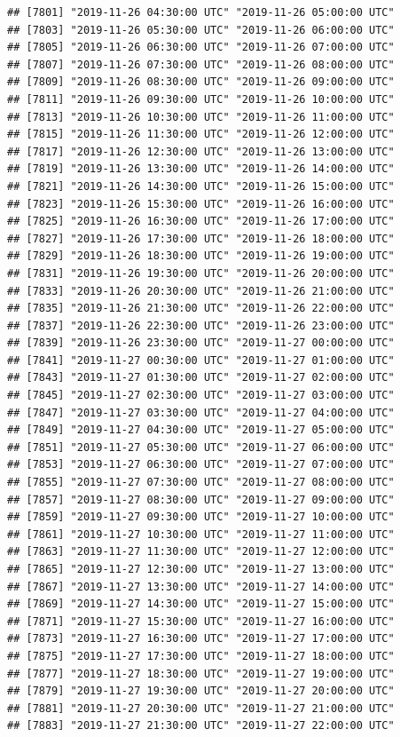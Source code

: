 \documentclass{article}\usepackage[]{graphicx}\usepackage[]{color}
\makeatletter
\newenvironment{kframe}{%
 \def\at@end@of@kframe{}%
 \ifinner\ifhmode%
  \def\at@end@of@kframe{\end{minipage}}%
  \begin{minipage}{\columnwidth}%
 \fi\fi%
 \def\FrameCommand##1{\hskip\@totalleftmargin \hskip-\fboxsep
 \colorbox{shadecolor}{##1}\hskip-\fboxsep
     \hskip-\linewidth \hskip-\@totalleftmargin \hskip\columnwidth}%
 \MakeFramed {\advance\hsize-\width
   \@totalleftmargin\z@ \linewidth\hsize
   \@setminipage}}%
 {\par\unskip\endMakeFramed%
 \at@end@of@kframe}
\newenvironment{knitrout}{}{} %
\makeatother
\begin{document}
\begin{knitrout}
\begin{kframe}
\begin{verbatim}
## [7801] "2019-11-26 04:30:00 UTC" "2019-11-26 05:00:00 UTC"
## [7803] "2019-11-26 05:30:00 UTC" "2019-11-26 06:00:00 UTC"
## [7805] "2019-11-26 06:30:00 UTC" "2019-11-26 07:00:00 UTC"
## [7807] "2019-11-26 07:30:00 UTC" "2019-11-26 08:00:00 UTC"
## [7809] "2019-11-26 08:30:00 UTC" "2019-11-26 09:00:00 UTC"
## [7811] "2019-11-26 09:30:00 UTC" "2019-11-26 10:00:00 UTC"
## [7813] "2019-11-26 10:30:00 UTC" "2019-11-26 11:00:00 UTC"
## [7815] "2019-11-26 11:30:00 UTC" "2019-11-26 12:00:00 UTC"
## [7817] "2019-11-26 12:30:00 UTC" "2019-11-26 13:00:00 UTC"
## [7819] "2019-11-26 13:30:00 UTC" "2019-11-26 14:00:00 UTC"
## [7821] "2019-11-26 14:30:00 UTC" "2019-11-26 15:00:00 UTC"
## [7823] "2019-11-26 15:30:00 UTC" "2019-11-26 16:00:00 UTC"
## [7825] "2019-11-26 16:30:00 UTC" "2019-11-26 17:00:00 UTC"
## [7827] "2019-11-26 17:30:00 UTC" "2019-11-26 18:00:00 UTC"
## [7829] "2019-11-26 18:30:00 UTC" "2019-11-26 19:00:00 UTC"
## [7831] "2019-11-26 19:30:00 UTC" "2019-11-26 20:00:00 UTC"
## [7833] "2019-11-26 20:30:00 UTC" "2019-11-26 21:00:00 UTC"
## [7835] "2019-11-26 21:30:00 UTC" "2019-11-26 22:00:00 UTC"
## [7837] "2019-11-26 22:30:00 UTC" "2019-11-26 23:00:00 UTC"
## [7839] "2019-11-26 23:30:00 UTC" "2019-11-27 00:00:00 UTC"
## [7841] "2019-11-27 00:30:00 UTC" "2019-11-27 01:00:00 UTC"
## [7843] "2019-11-27 01:30:00 UTC" "2019-11-27 02:00:00 UTC"
## [7845] "2019-11-27 02:30:00 UTC" "2019-11-27 03:00:00 UTC"
## [7847] "2019-11-27 03:30:00 UTC" "2019-11-27 04:00:00 UTC"
## [7849] "2019-11-27 04:30:00 UTC" "2019-11-27 05:00:00 UTC"
## [7851] "2019-11-27 05:30:00 UTC" "2019-11-27 06:00:00 UTC"
## [7853] "2019-11-27 06:30:00 UTC" "2019-11-27 07:00:00 UTC"
## [7855] "2019-11-27 07:30:00 UTC" "2019-11-27 08:00:00 UTC"
## [7857] "2019-11-27 08:30:00 UTC" "2019-11-27 09:00:00 UTC"
## [7859] "2019-11-27 09:30:00 UTC" "2019-11-27 10:00:00 UTC"
## [7861] "2019-11-27 10:30:00 UTC" "2019-11-27 11:00:00 UTC"
## [7863] "2019-11-27 11:30:00 UTC" "2019-11-27 12:00:00 UTC"
## [7865] "2019-11-27 12:30:00 UTC" "2019-11-27 13:00:00 UTC"
## [7867] "2019-11-27 13:30:00 UTC" "2019-11-27 14:00:00 UTC"
## [7869] "2019-11-27 14:30:00 UTC" "2019-11-27 15:00:00 UTC"
## [7871] "2019-11-27 15:30:00 UTC" "2019-11-27 16:00:00 UTC"
## [7873] "2019-11-27 16:30:00 UTC" "2019-11-27 17:00:00 UTC"
## [7875] "2019-11-27 17:30:00 UTC" "2019-11-27 18:00:00 UTC"
## [7877] "2019-11-27 18:30:00 UTC" "2019-11-27 19:00:00 UTC"
## [7879] "2019-11-27 19:30:00 UTC" "2019-11-27 20:00:00 UTC"
## [7881] "2019-11-27 20:30:00 UTC" "2019-11-27 21:00:00 UTC"
## [7883] "2019-11-27 21:30:00 UTC" "2019-11-27 22:00:00 UTC"

\end{verbatim}
\end{kframe}
\end{knitrout}
\end{document}
